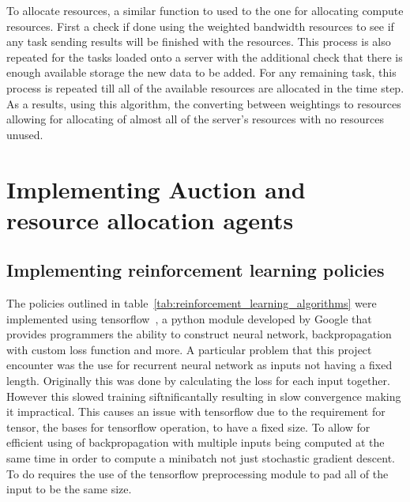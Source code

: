 To allocate
resources, a similar function to used to the one for allocating compute resources. First a check if done using the
weighted bandwidth resources to see if any task sending results will be finished with the resources.
This process is also repeated for the tasks loaded onto a server with the additional check that there
is enough available storage the new data to be added. For any remaining task, this process is
repeated till all of the available resources are allocated in the time step. As a results, using this algorithm, the
converting between weightings to resources allowing for allocating of almost all of the server's resources with no
resources unused.

\section{Implementing Auction and resource allocation agents}\label{sec:implementing-auction-and-resource-allocation-agents}


\subsection{Implementing reinforcement learning policies}\label{subsec:implementing-auction-and-resource-allocation-agents}
The policies outlined in table~\ref{tab:reinforcement_learning_algorithms} were implemented using
tensorflow~\citep{tensorflow2015-whitepaper}, a python module developed by Google
that provides programmers the ability to construct neural network, backpropagation with custom loss function and more. A
particular problem that this project encounter was the use for recurrent neural network as inputs not having a fixed length.
Originally this was done by calculating the loss for each input together. However this slowed training siftnificantally
resulting in slow convergence making it impractical. This causes an issue with tensorflow due to the requirement for
tensor, the bases for tensorflow operation, to have a fixed
size. To allow for efficient using of backpropagation with multiple inputs being computed at the same time in order to
compute a minibatch not just stochastic gradient descent. To do requires the use of the tensorflow preprocessing module
to pad all of the input to be the same size.

